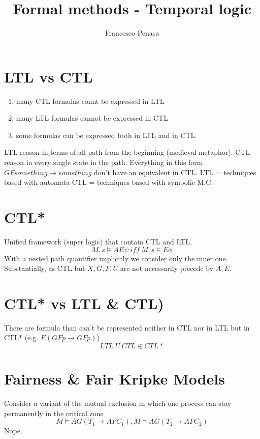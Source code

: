 \documentclass[11pt]{article}
\begin{document}
\author{Francesco Penasa}
\title{Formal methods - Temporal logic}
\maketitle

\medskip

\section{LTL vs CTL} %
\label{sec:ltl_vs_ctl}
\begin{enumerate}
	\item many CTL formulas connt be expressed in LTL
	\item many LTL formulas cannot be expressed in CTL
	\item some formulas can be expressed both in LTL and in CTL
\end{enumerate}
LTL reason in terms of all path from the beginning (medieval metaphor). CTL reason in every single state in the path.
Everything in this form $GF something \rightarrow something$ don't have an equivalent in CTL.
LTL = techniques based with automata
CTL = techniques based with symbolic M.C.

\section{CTL*} %
\label{sec:ctl_}
Unified framework (super logic) that contain CTL and LTL.
\[
	M,s \models AE \psi \ iff \ M,s \models E\phi
\]
With a nested path quantifier implicitly we consider only the inner one.
Substantially, as CTL but $X,G,F,U$ are not necessarily precede by $A, E$.

\section{CTL* vs LTL \& CTL)} %
\label{sec:ctl}
There are formula than can't be represented neither in CTL nor in LTL but in CTL*
(e.g. $E(GFp \rightarrow GFp)$)
\[
	LTL\ U\ CTL \in CTL*
\]


\section{Fairness \& Fair Kripke Models} %
\label{sec:fairness_}
Consider a variant of the mutual exclusion in which one process can stay permanently in the critical zone
\[
	M \models AG(T_1 \rightarrow AFC_1), M \models AG(T_2 \rightarrow AFC_2)
\] Nope.
\end{document}
